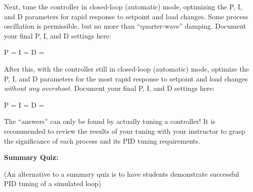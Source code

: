 Next, tune the controller in closed-loop (automatic) mode, optimizing the P, I, and D parameters for rapid response to setpoint and load changes.  Some process oscillation is permissible, but no more than ``quarter-wave'' damping.  Document your final P, I, and D settings here:

\vskip 10pt

P = \underbar{\hskip 50pt} \hskip 50pt I = \underbar{\hskip 50pt} \hskip 50pt D = \underbar{\hskip 50pt}

\vskip 20pt

After this, with the controller still in closed-loop (automatic) mode, optimize the P, I, and D parameters for the most rapid response to setpoint and load changes {\it without any overshoot}.  Document your final P, I, and D settings here:

\vskip 10pt

P = \underbar{\hskip 50pt} \hskip 50pt I = \underbar{\hskip 50pt} \hskip 50pt D = \underbar{\hskip 50pt}

\vskip 10pt







The ``answers'' can only be found by actually tuning a controller!  It is recommended to review the results of your tuning with your instructor to grasp the significance of each process and its PID tuning requirements.







\vfil \eject

\noindent
{\bf Summary Quiz:}

(An alternative to a summary quiz is to have students demonstrate successful PID tuning of a simulated loop)






